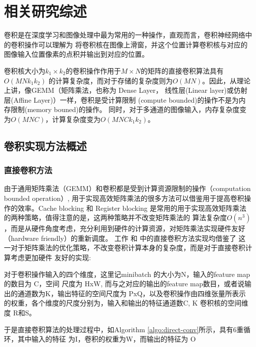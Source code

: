 
\chapter{相关研究综述}

卷积是在深度学习和图像处理中最为常用的一种操作，直观而言，卷积神经网络中的卷积操作可以理解为
将卷积核在图像上滑窗，并这个位置计算卷积核与对应的图像输入位置像素的点积并输出到对应的位置。

卷积核大小为$k_1 \times k_2$的卷积操作作用于$M \times N$的矩阵的直接卷积算法具有$O(MNk_1k_2)$
的计算复杂度，而对于存储的复杂度则为$O(MN)$。因此，从理论上讲，像GEMM（矩阵乘法，也称为
Dense Layer， 线性层(Linear layer)或仿射层(Affine Layer)）一样，卷积是受计算限制
(compute bounded)的操作不是为内存限制(memory bouned)的操作。
同时，对于多通道的图像输入，内存复杂度变为$O(MNC)$，计算复杂度变为$O(MNCk_1k_2)$。


\section{卷积实现方法概述}

\subsection{直接卷积方法}

由于通用矩阵乘法（GEMM）和卷积都是受到计算资源限制的操作（computation bounded operation）,
用于实现高效矩阵乘法的很多方法可以借鉴用于提高卷积操作的效率。Cache blocking 和 Register
blocking 是常用的用于实现高效矩阵乘法的两种策略，值得注意的是，这两种策略并不改变矩阵乘法的
算法复杂度$O(n^3)$，而是从硬件角度考虑，充分利用到硬件的计算资源，对矩阵乘法实现硬件友好（hardware
friendly）的重新调度。 工作
\cite{Georganas2018AnatomyOH} 和
\cite{Zhang2018HighPZ}
中的直接卷积方法实现均借鉴了
这一对于矩阵乘法的优化策略，不改变卷积计算本身的复杂度，而是对于直接卷积计算考虑更加硬件
友好的实现:

对于卷积操作输入的四个维度，这里记minibatch 的大小为N，输入的feature map的数目为 C，空间
尺度为 HxW, 而与之对应的输出的feature map数目，或者说输出的通道数为K，输出特征的空间尺度为
PxQ，以及卷积操作由四维张量所表示的权重，各个维度的尺度分别为，输入和输出的特征通道数C, K 
卷积核的空间维度 R和S。

于是直接卷积算法的处理过程中，如Algorithm \ref{algo:direct-conv}所示，具有6重循环，其中输入的特征
为I，卷积的权重为W，而输出的特征为 O 


